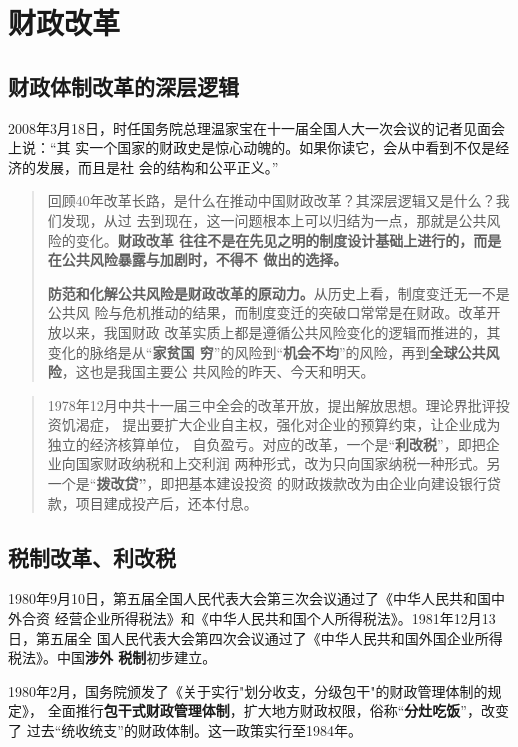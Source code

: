 \section{财政改革}

\subsection{财政体制改革的深层逻辑}

2008年3月18日，时任国务院总理温家宝在十一届全国人大一次会议的记者见面会上说：“其
实一个国家的财政史是惊心动魄的。如果你读它，会从中看到不仅是经济的发展，而且是社
会的结构和公平正义。”

\begin{quotation}
  回顾40年改革长路，是什么在推动中国财政改革？其深层逻辑又是什么？我们发现，从过
  去到现在，这一问题根本上可以归结为一点，那就是公共风险的变化。\textbf{财政改革
    往往不是在先见之明的制度设计基础上进行的，而是在公共风险暴露与加剧时，不得不
    做出的选择。}

  \textbf{防范和化解公共风险是财政改革的原动力。}从历史上看，制度变迁无一不是公共风
  险与危机推动的结果，而制度变迁的突破口常常是在财政。改革开放以来，我国财政
  改革实质上都是遵循公共风险变化的逻辑而推进的，其变化的脉络是从“\textbf{家贫国
    穷}”的风险到“\textbf{机会不均}”的风险，再到\textbf{全球公共风险}，这也是我国主要公
  共风险的昨天、今天和明天。\cite{cai40}
\end{quotation}

\begin{quotation}
  1978年12月中共十一届三中全会的改革开放，提出解放思想。理论界批评投资饥渴症，
  提出要扩大企业自主权，强化对企业的预算约束，让企业成为独立的经济核算单位，
  自负盈亏。对应的改革，一个是“\textbf{利改税}”，即把企业向国家财政纳税和上交利润
  两种形式，改为只向国家纳税一种形式。另一个是“\textbf{拨改贷”}，即把基本建设投资
  的财政拨款改为由企业向建设银行贷款，项目建成投产后，还本付息。\cite{bogaidai30}
\end{quotation}

\subsection{税制改革、利改税}

1980年9月10日，第五届全国人民代表大会第三次会议通过了《中华人民共和国中外合资
经营企业所得税法》和《中华人民共和国个人所得税法》。1981年12月13日，第五届全
国人民代表大会第四次会议通过了《中华人民共和国外国企业所得税法》。中国\textbf{涉外
  税制}初步建立。

1980年2月，国务院颁发了《关于实行"划分收支，分级包干"的财政管理体制的规定》，
全面推行\textbf{包干式财政管理体制}，扩大地方财政权限，俗称“\textbf{分灶吃饭}”，改变了
过去“统收统支”的财政体制。这一政策实行至1984年。

